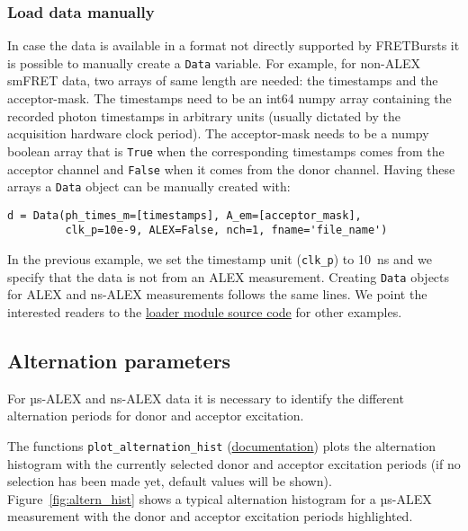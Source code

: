 \subsubsection{Load data manually}

In case the data is available in a format not directly supported by 
FRETBursts it is possible to manually create a \verb|Data| variable. 
For example, for non-ALEX smFRET data, two arrays of same length are 
needed: the timestamps and the acceptor-mask. The timestamps need to be 
an int64 numpy array containing the recorded photon timestamps in arbitrary 
units (usually dictated by the acquisition hardware clock period). 
The acceptor-mask needs to be a numpy boolean array that is \verb|True| 
when the corresponding timestamps comes from the acceptor channel and 
\verb|False| when it comes from the donor channel. Having these arrays a 
\verb|Data| object can be manually created with:

\begin{verbatim}
d = Data(ph_times_m=[timestamps], A_em=[acceptor_mask], 
         clk_p=10e-9, ALEX=False, nch=1, fname='file_name')
\end{verbatim}

In the previous example, we set the timestamp unit (\verb|clk_p|) to 10~ns 
and we specify that the data is not from an ALEX measurement. Creating 
\verb|Data| objects for ALEX and ns-ALEX measurements follows the same lines. 
We point the interested readers to the 
\href{https://github.com/tritemio/FRETBursts/blob/master/fretbursts/loader.py}{loader module source code} 
for other examples. 

\subsection{Alternation parameters}
\label{sec:alternation}

For µs-ALEX and ns-ALEX data it is necessary to identify the different 
alternation periods for donor and acceptor excitation.

The functions 
\verb|plot_alternation_hist| (\href{http://fretbursts.readthedocs.org/en/latest/plots.html#fretbursts.burst\_plot.plot\_alternation\_hist}{documentation})
plots the alternation histogram 
with the currently selected donor and acceptor excitation periods
(if no selection has been made yet, default values will be shown).
Figure~\ref{fig:altern_hist} shows a typical alternation histogram for
a µs-ALEX measurement with the donor and acceptor excitation periods highlighted.

